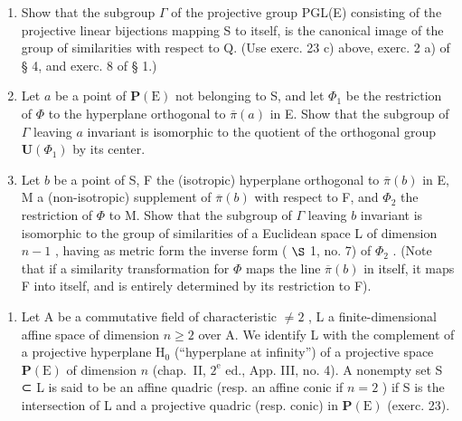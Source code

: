 \begin{enumerate}
\def\labelenumi{\alph{enumi})}
\item
  Show that the subgroup \(\Gamma\) of the projective group PGL(E) consisting of the projective linear bijections mapping S to itself, is the canonical image of the group of similarities with respect to Q. (Use exerc. 23 c) above, exerc. 2 a) of § 4, and exerc. 8 of § 1.)
\item
  Let \(a\) be a point of \(\mathbf{P}(\mathrm{E})\) not belonging to S, and let \(\Phi_{1}\) be the restriction of \(\Phi\) to the hyperplane orthogonal to \(\overline{\pi}(a)\) in E. Show that the subgroup of \(\Gamma\) leaving \(a\) invariant is isomorphic to the quotient of the orthogonal group \(\mathbf{U}(\Phi_1)\) by its center.
\item
  Let \(b\) be a point of S, F the (isotropic) hyperplane orthogonal to \(\overline{\pi}(b)\) in E, M a (non-isotropic) supplement of \(\overline{\pi}(b)\) with respect to F, and \(\Phi_{2}\) the restriction of \(\Phi\) to M. Show that the subgroup of \(\Gamma\) leaving \(b\) invariant is isomorphic to the group of similarities of a Euclidean space L of dimension \(n-1\) , having as metric form the inverse form ( \(\S\) 1, no. 7) of \(\Phi_{2}\) . (Note that if a similarity transformation for \(\Phi\) maps the line \(\overline{\pi}(b)\) in itself, it maps F into itself, and is entirely determined by its restriction to F).
\end{enumerate}

\begin{enumerate}
\def\labelenumi{\arabic{enumi})}
\setcounter{enumi}{24}
\tightlist
\item
  Let A be a commutative field of characteristic \(\neq 2\) , L a finite-dimensional affine space of dimension \(n \geqslant 2\) over A. We identify L with the complement of a projective hyperplane \(\mathrm{H}_{0}\) (“hyperplane at infinity”) of a projective space \(\mathbf{P}(\mathrm{E})\) of dimension \(n\) (chap.~II, \(2^{\mathrm{e}}\) ed., App. III, no. 4). A nonempty set S ⊂ L is said to be an affine quadric (resp. an affine conic if \(n = 2\) ) if S is the intersection of L and a projective quadric (resp. conic) in \(\mathbf{P}(\mathrm{E})\) (exerc. 23).
\end{enumerate}

